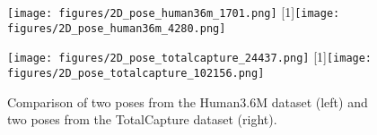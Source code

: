 \begin{figure}
	\centering
	\begin{minipage}{.45\textwidth}
		\texttt{[image: figures/2D\_pose\_human36m\_1701.png]}
		\scalebox{-1}[1]{\texttt{[image: figures/2D\_pose\_human36m\_4280.png]}}
	\end{minipage}
	\hspace{5mm}
	\begin{minipage}{.45\textwidth}
	\texttt{[image: figures/2D\_pose\_totalcapture\_24437.png]}
	\scalebox{-1}[1]{\texttt{[image: figures/2D\_pose\_totalcapture\_102156.png]}}
	\end{minipage}
	\caption{Comparison of two poses from the Human3.6M dataset (left) and two poses from the TotalCapture dataset (right).}
	\label{fig:human-totalcapture}
\end{figure}